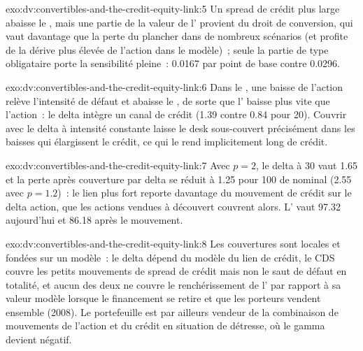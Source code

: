 \begin{solution}{exo:dv:convertibles-and-the-credit-equity-link:5}
Un spread de crédit plus large abaisse le , mais une partie de la valeur de l' provient du droit de conversion, qui vaut davantage que la perte
du plancher dans de nombreux scénarios (et profite de la dérive plus élevée de l'action dans le modèle)~; seule la partie de type obligataire porte la sensibilité pleine~: 0.0167 par point de base
contre 0.0296.
\end{solution}

\begin{solution}{exo:dv:convertibles-and-the-credit-equity-link:6}
Dans le , une baisse de l'action relève l'intensité de défaut et abaisse le , de sorte que l' baisse plus vite que l'action~: le
delta intègre un canal de crédit (1.39 contre 0.84 pour 20). Couvrir avec le delta à intensité constante laisse le desk sous-couvert précisément dans les baisses qui élargissent le crédit,
ce qui le rend implicitement long de crédit.
\end{solution}

\begin{solution}{exo:dv:convertibles-and-the-credit-equity-link:7}
Avec $p=2$, le delta à 30 vaut 1.65 et la perte après couverture par delta se réduit à 1.25 pour 100 de nominal (2.55 avec $p=1.2$)~: le lien plus fort reporte davantage du mouvement de crédit sur le delta
action, que les actions vendues à découvert couvrent alors. L' vaut 97.32 aujourd'hui et 86.18 après le mouvement.
\end{solution}

\begin{solution}{exo:dv:convertibles-and-the-credit-equity-link:8}
Les couvertures sont locales et fondées sur un modèle~: le delta dépend du modèle du lien de crédit, le CDS couvre les petits mouvements de spread de crédit mais non le saut de défaut en totalité, et aucun des deux
ne couvre le renchérissement de l' par rapport à sa valeur modèle lorsque le financement se retire et que les porteurs vendent ensemble (2008).
Le portefeuille est par ailleurs vendeur de la combinaison de mouvements de l'action et du crédit en situation de détresse, où le gamma devient négatif.
\end{solution}

